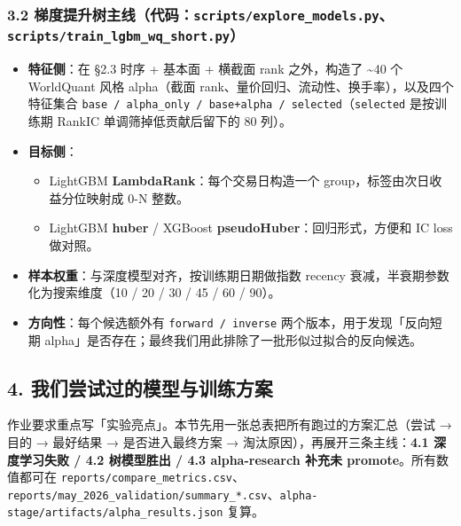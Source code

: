 \documentclass[
  fontset=fandol]{ctexart}
\providecommand{\tightlist}{%
  \setlength{\itemsep}{0pt}\setlength{\parskip}{0pt}}
\begin{document}
\hypertarget{ux68afux5ea6ux63d0ux5347ux6811ux4e3bux7ebfux4ee3ux7801scriptsexplore_models.pyscriptstrain_lgbm_wq_short.py}{%
\subsubsection{\texorpdfstring{3.2
梯度提升树主线（代码：\texttt{scripts/explore\_models.py}、\texttt{scripts/train\_lgbm\_wq\_short.py}）}{3.2 梯度提升树主线（代码：scripts/explore\_models.py、scripts/train\_lgbm\_wq\_short.py）}}\label{ux68afux5ea6ux63d0ux5347ux6811ux4e3bux7ebfux4ee3ux7801scriptsexplore_models.pyscriptstrain_lgbm_wq_short.py}}

\begin{itemize}
\tightlist
\item
  \textbf{特征侧}：在 §2.3 时序 + 基本面
  + 横截面 rank 之外，构造了
  \textasciitilde40 个 WorldQuant 风格
  alpha（截面
  rank、量价回归、流动性、换手率），以及四个特征集合
  \texttt{base\ /\ alpha\_only\ /\ base+alpha\ /\ selected}（\texttt{selected}
  是按训练期 RankIC
  单调筛掉低贡献后留下的 80 列）。
\item
  \textbf{目标侧}：

  \begin{itemize}
  \tightlist
  \item
    LightGBM
    \textbf{LambdaRank}：每个交易日构造一个
    group，标签由次日收益分位映射成 0-N
    整数。
  \item
    LightGBM \textbf{huber} / XGBoost
    \textbf{pseudoHuber}：回归形式，方便和
    IC loss 做对照。
  \end{itemize}
\item
  \textbf{样本权重}：与深度模型对齐，按训练期日期做指数
  recency
  衰减，半衰期参数化为搜索维度（10 / 20
  / 30 / 45 / 60 / 90）。
\item
  \textbf{方向性}：每个候选额外有
  \texttt{forward\ /\ inverse}
  两个版本，用于发现「反向短期
  alpha」是否存在；最终我们用此排除了一批形似过拟合的反向候选。
\end{itemize}

\hypertarget{ux6211ux4eecux5c1dux8bd5ux8fc7ux7684ux6a21ux578bux4e0eux8badux7ec3ux65b9ux6848}{%
\subsection{4.
我们尝试过的模型与训练方案}\label{ux6211ux4eecux5c1dux8bd5ux8fc7ux7684ux6a21ux578bux4e0eux8badux7ec3ux65b9ux6848}}

作业要求重点写「实验亮点」。本节先用一张总表把所有跑过的方案汇总（尝试
→ 目的 → 最好结果 → 是否进入最终方案 →
淘汰原因），再展开三条主线：\textbf{4.1
深度学习失败 / 4.2 树模型胜出 / 4.3
alpha-research 补充未
promote}。所有数值都可在
\texttt{reports/compare\_metrics.csv}、\texttt{reports/may\_2026\_validation/summary\_*.csv}、\texttt{alpha-stage/artifacts/alpha\_results.json}
复算。
\end{document}
